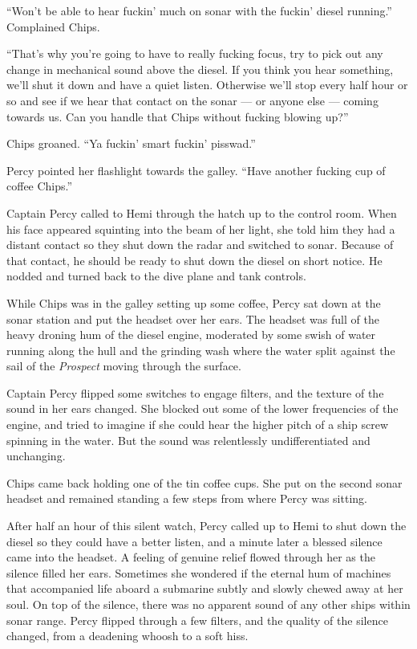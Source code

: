 \documentclass[]{scrbook}
\begin{document}
``Won't be able to hear fuckin' much on sonar with the fuckin' diesel
running.'' Complained Chips.

``That's why you're going to have to really fucking focus, try to pick
out any change in mechanical sound above the diesel. If you think you
hear something, we'll shut it down and have a quiet listen. Otherwise
we'll stop every half hour or so and see if we hear that contact on the
sonar --- or anyone else --- coming towards us. Can you handle that
Chips without fucking blowing up?''

Chips groaned. ``Ya fuckin' smart fuckin' pisswad.''

Percy pointed her flashlight towards the galley. ``Have another fucking
cup of coffee Chips.''

Captain Percy called to Hemi through the hatch up to the control room.
When his face appeared squinting into the beam of her light, she told
him they had a distant contact so they shut down the radar and switched
to sonar. Because of that contact, he should be ready to shut down the
diesel on short notice. He nodded and turned back to the dive plane and
tank controls.

While Chips was in the galley setting up some coffee, Percy sat down at
the sonar station and put the headset over her ears. The headset was
full of the heavy droning hum of the diesel engine, moderated by some
swish of water running along the hull and the grinding wash where the
water split against the sail of the \emph{Prospect} moving through the
surface.

Captain Percy flipped some switches to engage filters, and the texture
of the sound in her ears changed. She blocked out some of the lower
frequencies of the engine, and tried to imagine if she could hear the
higher pitch of a ship screw spinning in the water. But the sound was
relentlessly undifferentiated and unchanging.

Chips came back holding one of the tin coffee cups. She put on the
second sonar headset and remained standing a few steps from where Percy
was sitting.

After half an hour of this silent watch, Percy called up to Hemi to shut
down the diesel so they could have a better listen, and a minute later a
blessed silence came into the headset. A feeling of genuine relief
flowed through her as the silence filled her ears. Sometimes she
wondered if the eternal hum of machines that accompanied life aboard a
submarine subtly and slowly chewed away at her soul. On top of the
silence, there was no apparent sound of any other ships within sonar
range. Percy flipped through a few filters, and the quality of the
silence changed, from a deadening whoosh to a soft hiss.
\end{document}
